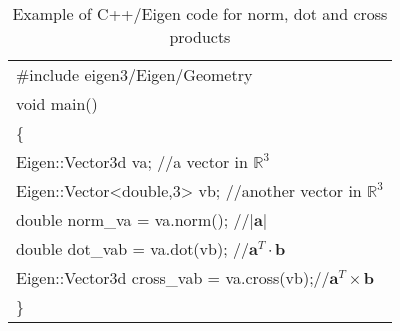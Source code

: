 \begin{table}[h]
\caption{Example of C++/Eigen code for norm, dot and cross products}
\begin{tabular}
[l]{|l|}
\hline
\rowcolor{Gray} \ttfamily \#include eigen3/Eigen/Geometry \\
\rowcolor{Gray} \ttfamily void main() \\
\rowcolor{Gray} \ttfamily \{ \\
\rowcolor{Gray} \ttfamily \hspace{1cm} Eigen::Vector3d va; //a vector in $\mathbb{R}^3$\\ 
\rowcolor{Gray} \ttfamily \hspace{1cm} Eigen::Vector<double,3> vb; //another vector in $\mathbb{R}^3$\\ 
\rowcolor{Gray} \ttfamily \hspace{1cm} double norm\_va = va.norm(); //$|\mathbf{a}|$\\
\rowcolor{Gray} \ttfamily \hspace{1cm} double dot\_vab = va.dot(vb); //$\mathbf{a}^T \cdot \mathbf{b}$\\
\rowcolor{Gray} \ttfamily \hspace{1cm} Eigen::Vector3d cross\_vab = va.cross(vb);//$\mathbf{a}^T \times \mathbf{b}$\\
\rowcolor{Gray} \ttfamily \} \\
\hline
\end{tabular}
\label{tab:norm_dot_cross}
\end{table}


